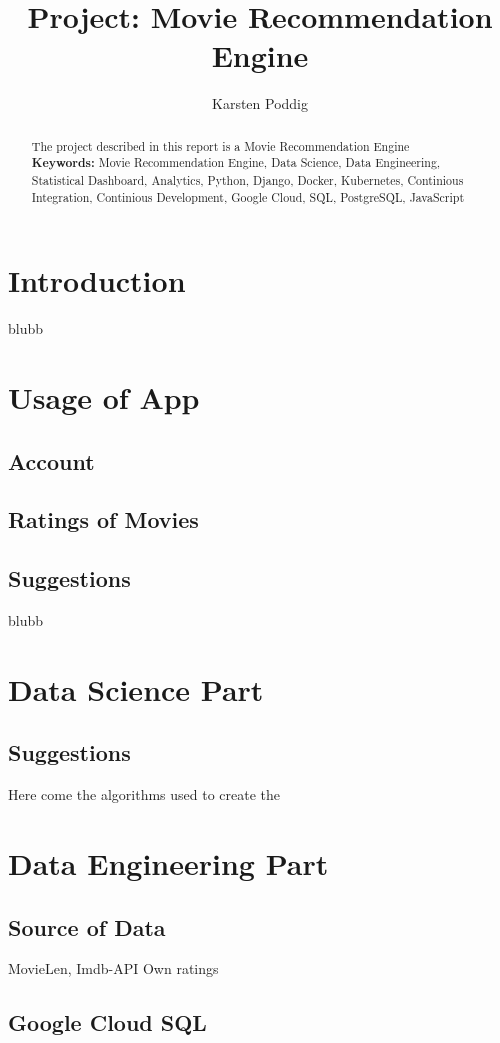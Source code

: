 \documentclass{article}
\title{Project: Movie Recommendation Engine}
\author{Karsten Poddig}
\begin{document}
\maketitle

\begin{abstract}
The project described in this report is a Movie Recommendation Engine\\
\textbf{Keywords:} Movie Recommendation Engine, Data Science, Data Engineering, Statistical Dashboard, Analytics, Python, Django, Docker, Kubernetes, Continious Integration, Continious Development, Google Cloud, SQL, PostgreSQL, JavaScript

\end{abstract}

\tableofcontents

\newpage


\section{Introduction}


blubb

\section{Usage of App}

\subsection{Account}


\subsection{Ratings of Movies}

\subsection{Suggestions}

blubb


\section{Data Science Part}

\subsection{Suggestions}


Here come the algorithms used to create the 

\section{Data Engineering Part}

\subsection{Source of Data}

MovieLen, Imdb-API
Own ratings


\subsection{Google Cloud SQL}
\end{document}
